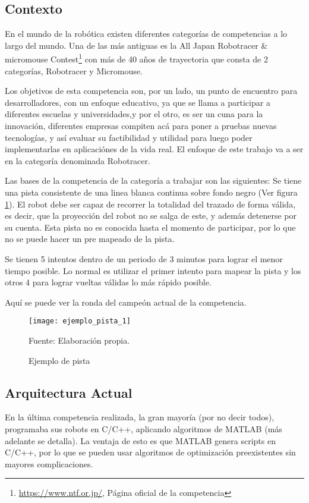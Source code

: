 
\subsection{Contexto}

En el mundo de la robótica existen diferentes categorías de competencias a lo largo del mundo. Una de las más antiguas es la All Japan Robotracer \& micromouse Contest\footnote{\url{https://www.ntf.or.jp/}, Página oficial de la competencia} con más de 40 años de trayectoria que consta de 2 categorías, Robotracer y Micromouse. 

Los objetivos de esta competencia son, por un lado, un punto de encuentro para desarrolladores, con un enfoque educativo, ya que se llama a participar a diferentes escuelas y universidades,y por el otro, es ser un cuna para la innovación, diferentes empresas compiten acá para poner a pruebas nuevas tecnologías, y así evaluar su factibilidad y utilidad para luego poder implementarlas en aplicaciónes de la vida real. El enfoque de este trabajo va a ser en la categoría denominada Robotracer.

Las bases de la competencia de la categoría a trabajar son las siguientes: Se tiene una pista consistente de una linea blanca continua sobre fondo negro (Ver figura \ref{fig:pista1}). El robot debe ser capaz de recorrer la totalidad del trazado de forma válida, es decir, que la proyección del robot no se salga de este, y además detenerse por su cuenta. Esta pista no es conocida hasta el momento de participar, por lo que no se puede hacer un pre mapeado de la pista.

Se tienen 5 intentos dentro de un periodo de 3 minutos para lograr el menor tiempo posible. Lo normal es utilizar el primer intento para mapear la pista y los otros 4 para lograr vueltas válidas lo más rápido posible.

Aquí se puede ver la ronda del campeón actual de la competencia. \cite{ganador2023}

\begin{figure}[h]
\centering
\texttt{[image: ejemplo\_pista\_1]}
\caption{\label{fig:pista1} Ejemplo de pista} Fuente: Elaboración propia.
\end{figure}

\subsection{Arquitectura Actual}
En la última competencia realizada, la gran mayoría (por no decir todos), programaba sus robots en C/C++, aplicando algoritmos de MATLAB (más adelante se detalla). La ventaja de esto es que MATLAB genera scripts en C/C++, por lo que se pueden usar algoritmos de optimización preexistentes sin mayores complicaciones.

